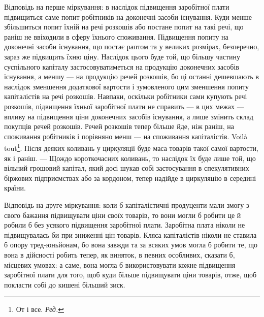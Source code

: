 Відповідь на перше міркування: в наслідок підвищення заробітної
плати підвищиться саме попит робітників на доконечні засоби існування.
Куди менше збільшиться попит їхній на речі розкошів або постане попит
на такі речі, що раніш не ввіходили в сферу їхнього споживання. Підвищення
попиту на доконечні засоби існування, що постає раптом та у
великих розмірах, безперечно, зараз же підвищить їхню ціну. Наслідок
цього буде той, що більшу частину суспільного капіталу застосовуватиметься
на продукцію доконечних засобів існування, а меншу — на продукцію
речей розкошів, бо ці останні дешевшають в наслідок зменшення
додаткової вартости і зумовленого цим зменшення попиту капіталістів на
речі розкошів. Навпаки, оскільки робітники сами купують речі розкошів,
підвищення їхньої заробітної плати не справить — в цих межах — впливу на
підвищення ціни доконечних засобів існування, а лише змінить склад
покупців речей розкошів. Речей розкошів тепер більше йде, ніж раніш,
на споживання робітників і порівняно менш — на споживання капіталістів.
Voilà tout\footnote*{
От і все. \emph{Ред.}
}. Після деяких коливань у циркуляції буде маса товарів такої
самої вартости, як і раніш. — Щождо короткочасних коливань, то наслідок
їх буде лише той, що вільний грошовий капітал, який досі шукав собі
застосування в спекулятивних біржових підприємствах або за кордоном,
тепер надійде в циркуляцію в середині країни.

Відповідь на друге міркування: коли б капіталістичні продуценти
мали змогу з свого бажання підвищувати ціни своїх товарів, то вони
могли б робити це й робили б без усякого підвищення заробітної плати.
Заробітна плата ніколи не підвищувалась би при зниженні цін товарів.
Кляса капіталістів ніколи не ставила б опору тред-юньйонам, бо вона
завжди та за всяких умов могла б робити те, що вона в дійсності робить
тепер, як виняток, в певних особливих, сказати б, місцевих умовах:
а саме, вона могла б використовувати кожне підвищення заробітної плати
для того, щоб куди більше підвищувати ціни товарів, отже, щоб покласти
собі до кишені більший зиск.

